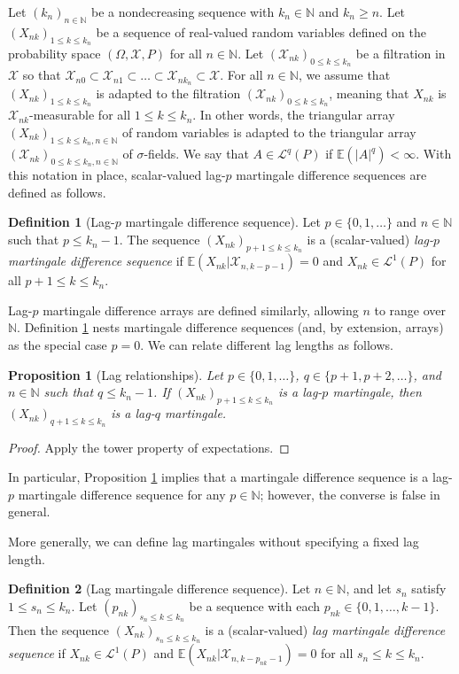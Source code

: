 \documentclass[11pt]{article}
\newcommand{\E}{\mathbb{E}}
\newcommand{\N}{\mathbb{N}}
\newcommand{\X}{\mathcal{X}}
\renewcommand{\L}{\mathcal{L}}
\newtheorem{proposition}{Proposition}
\theoremstyle{definition}
\newtheorem{definition}{Definition}
\begin{document}
Let $(k_n)_{n \in \N}$ be a nondecreasing sequence with $k_n \in \N$ and $k_n \geq n$.
Let $(X_{nk})_{1 \leq k \leq k_n}$ be a sequence of real-valued random variables defined on the probability space $(\Omega, \X, P)$ for all $n \in \N$.
Let $(\X_{nk})_{0 \leq k \leq k_n}$ be a filtration in $\X$ so that $\X_{n0} \subset \X_{n1} \subset \ldots \subset \X_{n k_n} \subset \X$.
For all $n \in \N$, we assume that $(X_{nk})_{1 \leq k \leq k_n}$ is adapted to the filtration $(\X_{nk})_{0 \leq k \leq k_n}$, meaning that $X_{nk}$ is $\X_{nk}$-measurable for all $1 \leq k \leq k_n$.
In other words, the triangular array $(X_{nk})_{1 \leq k \leq k_n, n \in \N}$ of random variables is adapted to the triangular array $(\X_{nk})_{0 \leq k \leq k_n, n \in \N}$ of $\sigma$-fields.
We say that $A \in \L^q(P)$ if $\E(|A|^q) < \infty$.
With this notation in place, scalar-valued lag-$p$ martingale difference sequences are defined as follows.
\begin{definition}[Lag-$p$ martingale difference sequence] \label{def:lag-martingale}
Let $p \in \{0, 1, \ldots\}$ and $n \in \N$ such that $p \leq k_n - 1$.
The sequence $(X_{nk})_{p+1 \leq k \leq k_n}$ is a (scalar-valued) \emph{lag-$p$ martingale difference sequence} if $\E(X_{nk} | \X_{n,k-p-1}) = 0$ and $X_{nk} \in \L^1(P)$ for all $p+1 \leq k \leq k_n$.
\end{definition}
Lag-$p$ martingale difference arrays are defined similarly, allowing $n$ to range over $\N$.
Definition \ref{def:lag-martingale} nests martingale difference sequences (and, by extension, arrays) as the special case $p=0$.
We can relate different lag lengths as follows.
\begin{proposition}[Lag relationships] \label{prop:lag-relationships}
Let $p \in \{0, 1, \ldots\}$, $q \in \{p+1, p+2, \ldots\}$, and $n \in \N$ such that $q \leq k_n - 1$.
If $(X_{nk})_{p+1 \leq k \leq k_n}$ is a lag-$p$ martingale, then $(X_{nk})_{q+1 \leq k \leq k_n}$ is a lag-$q$ martingale.
\end{proposition}
\begin{proof}
Apply the tower property of expectations.
\end{proof}
In particular, Proposition \ref{prop:lag-relationships} implies that a martingale difference sequence is a lag-$p$ martingale difference sequence for any $p \in \N$; however, the converse is false in general.

More generally, we can define lag martingales without specifying a fixed lag length.

\begin{definition}[Lag martingale difference sequence] \label{def:lag-p-martingale}
Let \(n \in \N\), and let \(s_n\) satisfy \(1\leq s_n\leq k_n\).
Let $(p_{nk})_{s_n \leq k \leq k_n}$ be a sequence with each $p_{nk} \in \{0, 1, \ldots, k-1\}$.
Then the sequence $(X_{nk})_{s_n \leq k \leq k_n}$ is a (scalar-valued) \emph{lag martingale difference sequence} if \(X_{nk} \in \L^1(P)\) and $\E(X_{nk} | \X_{n,k-p_{nk} - 1}) = 0$ for all $s_n \leq k \leq k_n$.
\end{definition}
\end{document}
